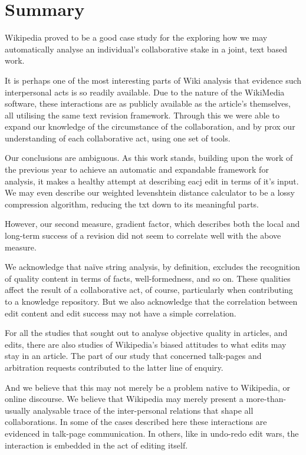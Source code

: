\section{Summary}
Wikipedia proved to be a good case study for the exploring how we may
automatically analyse an individual's collaborative stake in a joint,
text based work.

It is perhaps one of the most interesting parts of Wiki analysis that
evidence such interpersonal acts is so readily available. Due to the
nature of the WikiMedia software, these interactions are as publicly
available as the article's themselves, all utilising the same text
revision framework. Through this we were able to expand our knowledge
of the circumstance of the collaboration, and by prox our
understanding of each collaborative act, using one set of tools.

Our conclusions are ambiguous. As this work stands, building upon the
work of the previous year to achieve an automatic and expandable
framework for analysis, it makes a healthy attempt at describing eacj
edit in terms of it's input. We may even describe our weighted
levenshtein distance calculator to be a lossy compression algorithm,
reducing the txt down to its meaningful parts.

However, our second measure, gradient factor, which describes both the
local and long-term success of a revision did not seem to correlate
well with the above measure.

We acknowledge that na\"ive string analysis, by definition, excludes
the recognition of quality content in terms of facts, well-formedness,
and so on. These qualities affect the result of a collaborative act,
of course, particularly when contributing to a knowledge
repository. But we also acknowledge that the correlation between edit
content and edit success may not have a simple correlation.

For all the studies that sought out to analyse objective quality in
articles, and edits, there are also studies of Wikipedia's biased
attitudes to what edits may stay in an article. The part of our study
that concerned talk-pages and arbitration requests contributed to the
latter line of enquiry.

And we believe that this may not merely be a problem native to
Wikipedia, or online discourse. We believe that Wikipedia may merely
present a more-than-usually analysable trace of the inter-personal
relations that shape all collaborations. In some of the cases
described here these interactions are evidenced in talk-page
communication. In others, like in undo-redo edit wars, the interaction
is embedded in the act of editing itself. 

